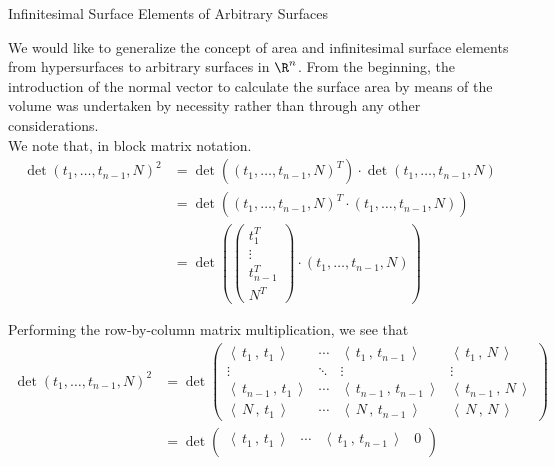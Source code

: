 \documentclass[smaller,hyperref={CJKbookmarks=true}]{beamer}
\newcommand{\scp}[2]{\left\langle\,#1\,,\,#2\,\right\rangle} \newcommand{\scpp}{\langle\,\cdot\,,\,\cdot\,\rangle}
\begin{document}
\begin{frame}{Infinitesimal Surface Elements of Arbitrary Surfaces}
\begin{spacing}{1}
We would like to generalize the concept of area and infinitesimal surface
elements from hypersurfaces to arbitrary surfaces in $\R^n$. From the
beginning, the introduction of the normal vector to calculate the surface
area by means of the volume was undertaken by necessity rather than
through any other considerations.\\[5pt]
We note that, in block matrix notation.
\begin{equation*}
  \begin{split}
     \det(t_1,\ldots,t_{n-1},N)^2 &=\det\left((t_1,\ldots,t_{n-1},N)^T\right)
     \cdot\det(t_1,\ldots,t_{n-1},N) \\
       &=\det\left((t_1,\ldots,t_{n-1},N)^T\cdot
       (t_1,\ldots,t_{n-1},N)\right) \\
       &=\det\left(\begin{pmatrix}
                     t_1^T \\
                     \vdots \\
                     t_{n-1}^T \\
                     N^T
                   \end{pmatrix}\cdot(t_1,\ldots,t_{n-1},N)\right)
  \end{split}
\end{equation*}
\end{spacing}
\newpage
\begin{spacing}{0.9}
Performing the row-by-column matrix multiplication, we see that
\begin{equation*}
  \begin{split}
     \det(t_1,\ldots,t_{n-1},N)^2 &=\det\begin{pmatrix}
             \scp{t_1}{t_1} & \cdots & \scp{t_1}{t_{n-1}} & \scp{t_1}{N} \\
             \vdots & \ddots
             & \vdots & \vdots \\
              \scp{t_{n-1}}{t_1} & \cdots & \scp{t_{n-1}}{t_{n-1}} & \scp{t_{n-1}}{N} \\
             \scp{N}{t_1} & \cdots & \scp{N}{t_{n-1}}& \scp{N}{N}
           \end{pmatrix} \\
       &=\det\begin{pmatrix}
             \scp{t_1}{t_1} & \cdots & \scp{t_1}{t_{n-1}} & 0\\

\end{pmatrix}
\end{split}
\end{equation*}
\end{spacing}
\end{frame}
\end{document}
